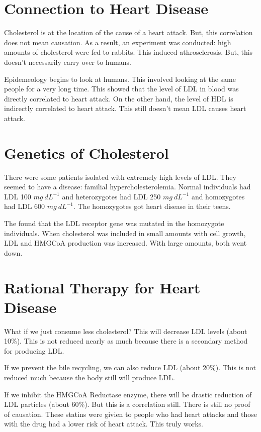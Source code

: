 \documentclass{article}
\begin{document}
\section{ Connection to Heart Disease }

Cholesterol is at the location of the cause of a heart attack. But, this
correlation does not mean causation. As a result, an experiment was conducted:
high amounts of cholesterol were fed to rabbits. This induced athrosclerosis.
But, this doesn't necessarily carry over to humans. 

Epidemeology begins to look at humans. This involved looking at the same people
for a very long time. This showed that the level of LDL in blood was directly
correlated to heart attack. On the other hand, the level of HDL is indirectly
correlated to heart attack. This still doesn't mean LDL causes heart attack. 

\section{ Genetics of Cholesterol }

There were some patients isolated with extremely high levels of LDL. They seemed
to have a disease: familial hypercholesterolemia. Normal individuals had LDL 100
$\si{ mg\ dL^{-1} }$ and heterozygotes had LDL 250 $\si{ mg\ dL^{-1} }$ and
homozygotes had LDL 600 $\si{ mg\ dL^{-1} }$. The homozygotes got heart
disease in their teens. 

The found that the LDL receptor gene was mutated in the homozygote individuals.
When cholesterol was included in small amounts with cell growth, LDL and HMGCoA
production was increased. With large amounts, both went down.

\section{ Rational Therapy for Heart Disease }

What if we just consume less cholesterol? This will decrease LDL levels (about
10\%). This is not reduced nearly as much because there is a secondary method
for producing LDL.

If we prevent the bile recycling, we can also reduce LDL (about 20\%). This is
not reduced much because the body still will produce LDL.

If we inhibit the HMGCoA Reductase enzyme, there will be drastic reduction of
LDL particles (about 60\%). But this is a correlation still. There is still no
proof of causation. These statins were givien to people who had heart attacks
and those with the drug had a lower risk of heart attack. This truly works.
\end{document}
